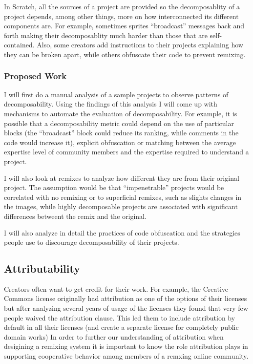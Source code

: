 In Scratch, all the sources of a project are provided so the decomposablity of a project depends, among other things, more on how interconnected its different components are. 
For example, sometimes sprites ``broadcast'' messages back and forth making their decomposablity much harder than those that are self-contained.
Also, some creators add instructions to their projects explaining how they can be broken apart, while others obfuscate their code to prevent remixing.

\subsubsection{Proposed Work}
I will first do a manual analysis of a sample projects to observe patterns of decomposability. 
Using the findings of this analysis I will come up with mechanisms to automate the evaluation of decomposability. 
For example, it is possible that a decomposability metric could depend on the use of particular blocks (the ``broadcast'' block could reduce its ranking, while comments in the code would increase it), explicit obfuscation or matching between the average expertise level of community members and the expertise required to understand a project.

I will also look at remixes to analyze how different they are from their original project. 
The assumption would be that ``impenetrable'' projects would be correlated with no remixing or to superficial remixes, such as slights changes in the images,
while highly decomposable projects are associated with significant differences betweent the remix and the original.

I will also analyze in detail the practices of code obfuscation and the strategies people use to discourage decomposability of their projects.

\subsection{Attributability}
Creators often want to get credit for their work. 
For example, the Creative Commons license originally had attribution as one of the options of their licenses but after analyzing several years of usage of the licenses they found that very few people waived the attribution clause. 
This led them to include attribution by default in all their licenses (and create a separate license for completely public domain works) \citep{brown_announcing_2004}
In order to further our understanding of attribution when desigining a remixing system it is important to know the role attribution plays in supporting cooperative behavior among members of a remxing online community.

